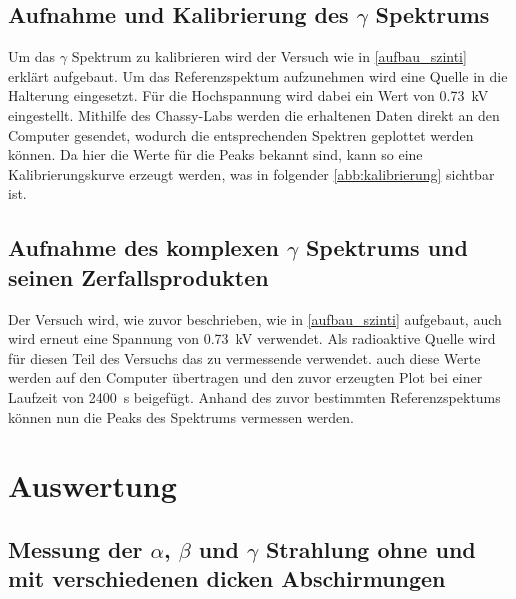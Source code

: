 \documentclass[12pt,english,ngerman]{scrartcl}
\begin{document}
\subsection{Aufnahme und Kalibrierung des \texorpdfstring{$\gamma$}{gamma} Spektrums}

Um das $\gamma$ Spektrum zu kalibrieren wird der Versuch wie in
\autoref{aufbau_szinti} erklärt aufgebaut. Um das Referenzspektum aufzunehmen
wird eine  Quelle in die Halterung eingesetzt. Für die
Hochspannung wird dabei ein Wert von \SI{0.73}{\kilo\volt} eingestellt.
Mithilfe des Chassy-Labs werden die erhaltenen Daten direkt an den Computer
gesendet, wodurch die entsprechenden Spektren geplottet werden können. Da hier
die Werte für die Peaks bekannt sind, kann so eine Kalibrierungskurve erzeugt
werden, was in folgender \autoref{abb:kalibrierung} sichtbar ist.



\subsection{Aufnahme des komplexen \texorpdfstring{$\gamma$}{gamma} Spektrums und seinen Zerfallsprodukten}

Der Versuch wird, wie zuvor beschrieben, wie in \autoref{aufbau_szinti}
aufgebaut, auch wird erneut eine Spannung von \SI{0.73}{\kilo\volt} verwendet.
Als radioaktive Quelle wird für diesen Teil des Versuchs das zu vermessende
 verwendet. auch diese Werte werden auf den Computer
übertragen und den zuvor erzeugten Plot bei einer Laufzeit von
\SI{2400}{\second} beigefügt. Anhand des zuvor bestimmten Referenzspektums
können nun die Peaks des  Spektrums vermessen werden.





\section{Auswertung}\label{sec:Auswertung}

\subsection{Messung der \texorpdfstring{$\alpha$}{alpha}, \texorpdfstring{$\beta$}{beta} und 
\texorpdfstring{$\gamma$}{gamma} Strahlung ohne und mit verschiedenen dicken Abschirmungen}
\end{document}

